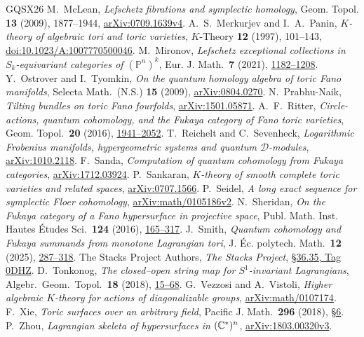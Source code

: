 \begin{thebibliography}{GQSX26}
 M.~McLean, \emph{Lefschetz fibrations and symplectic homology}, Geom. Topol. \textbf{13} (2009), 1877--1944, \href{https://arxiv.org/abs/0709.1639v4}{arXiv:0709.1639v4}.
 A.~S.~Merkurjev and I.~A.~Panin, \emph{$K$-theory of algebraic tori and toric varieties}, $K$-Theory \textbf{12} (1997), 101--143, \href{https://doi.org/10.1023/A:1007770500046}{doi:10.1023/A:1007770500046}.
 M.~Mironov, \emph{Lefschetz exceptional collections in $S_k$-equivariant categories of $(\mathbb P^n)^k$}, Eur. J. Math.\ \textbf{7} (2021), \href{https://arxiv.org/abs/1807.01534}{1182--1208}.
 Y.~Ostrover and I.~Tyomkin, \emph{On the quantum homology algebra of toric Fano manifolds}, Selecta Math.\ (N.S.) \textbf{15} (2009), \href{https://arxiv.org/abs/0804.0270}{arXiv:0804.0270}.
 N.~Prabhu-Naik, \emph{Tilting bundles on toric Fano fourfolds}, \href{https://arxiv.org/abs/1501.05871}{arXiv:1501.05871}.
 A.~F.~Ritter, \emph{Circle-actions, quantum cohomology, and the Fukaya category of Fano toric varieties}, Geom. Topol.\ \textbf{20} (2016), \href{https://msp.org/gt/2016/20-4/gt-v20-n4-p04-s.pdf}{1941--2052}.
 T.~Reichelt and C.~Sevenheck, \emph{Logarithmic Frobenius manifolds, hypergeometric systems and quantum $\mathcal D$-modules}, \href{https://arxiv.org/abs/1010.2118}{arXiv:1010.2118}.
 F.~Sanda, \emph{Computation of quantum cohomology from Fukaya categories}, \href{https://arxiv.org/abs/1712.03924}{arXiv:1712.03924}.
 P.~Sankaran, \emph{$K$-theory of smooth complete toric varieties and related spaces}, \href{https://arxiv.org/abs/0707.1566}{arXiv:0707.1566}.
 P.~Seidel, \emph{A long exact sequence for symplectic Floer cohomology}, \href{https://arxiv.org/abs/math/0105186v2}{arXiv:math/0105186v2}.
 N.~Sheridan, \emph{On the Fukaya category of a Fano hypersurface in projective space}, Publ. Math. Inst. Hautes \'Etudes Sci.\ \textbf{124} (2016), \href{https://doi.org/10.1007/s10240-016-0082-8}{165--317}.
 J.~Smith, \emph{Quantum cohomology and Fukaya summands from monotone Lagrangian tori}, J. \'Ec. polytech. Math.\ \textbf{12} (2025), \href{https://doi.org/10.5802/jep.290}{287--318}.
 The Stacks Project Authors, \emph{The Stacks Project}, \href{https://stacks.math.columbia.edu/tag/0DHZ}{\S36.35, Tag 0DHZ}.
 D.~Tonkonog, \emph{The closed--open string map for $S^1$-invariant Lagrangians}, Algebr.\ Geom.\ Topol.\ \textbf{18} (2018), \href{https://msp.org/agt/2018/18-1/agt-v18-n1-p02-p.pdf}{15--68}.
 G.~Vezzosi and A.~Vistoli, \emph{Higher algebraic $K$-theory for actions of diagonalizable groups}, \href{https://arxiv.org/abs/math/0107174}{arXiv:math/0107174}.
 F.~Xie, \emph{Toric surfaces over an arbitrary field}, Pacific J. Math.\ \textbf{296} (2018), \href{https://msp.org/pjm/2018/296-2/pjm-v296-n2-p10-s.pdf}{\S6}.
 P.~Zhou, \emph{Lagrangian skeleta of hypersurfaces in $(\mathbb C^*)^n$}, \href{https://arxiv.org/abs/1803.00320v3}{arXiv:1803.00320v3}.
\end{thebibliography}
